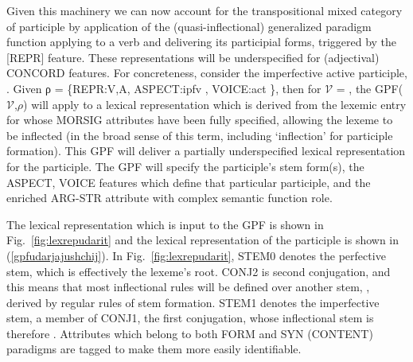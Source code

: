 \documentclass[output=paper,
modfonts
]{LSP/langsci}
\begin{document}
\begin{sloppypar}
Given this machinery we can now account for the transpositional mixed category of participle by application of the (quasi-inflectional) generalized paradigm function applying to a verb and delivering its participial forms, triggered by the [REPR] feature. These representations will be underspecified for (adjectival) CONCORD features.  For concreteness, consider the imperfective active participle, . Given ρ = \{REPR:\lab V,A\rab, ASPECT:ipfv\,\,, VOICE:act\,\,\}, then for $\mathcal{V}$ = , the GPF(\lab$\mathcal{V}$,$\rho$\rab) will apply to %
a lexical representation which is derived from the lexemic entry for  %
whose MORSIG attributes have been fully specified, allowing the lexeme to be inflected (in the broad sense of this term, including ‘inflection’ for participle formation).
This GPF will deliver a partially underspecified lexical representation for the participle. The GPF will specify the participle’s stem form(s), the ASPECT, VOICE features which define that particular participle, and the enriched ARG-STR attribute with complex semantic function role. %

The lexical representation which is input to the GPF is shown in Fig.~\ref{fig:lexrepudarit} and the lexical representation of the participle is shown in (\ref{gpfudarjajushchij}). %
In Fig.~\ref{fig:lexrepudarit},  STEM0 denotes the perfective stem, which is effectively the lexeme’s root. CONJ2 is second conjugation, and %
this means that most inflectional rules will be defined over another stem, , derived by regular rules of stem formation. %
STEM1 denotes the imperfective stem, a member of CONJ1, the first conjugation, whose inflectional stem is therefore .  Attributes which belong to both FORM and SYN (CONTENT) paradigms are tagged to make them more easily identifiable.%



\end{sloppypar}
\end{document}
